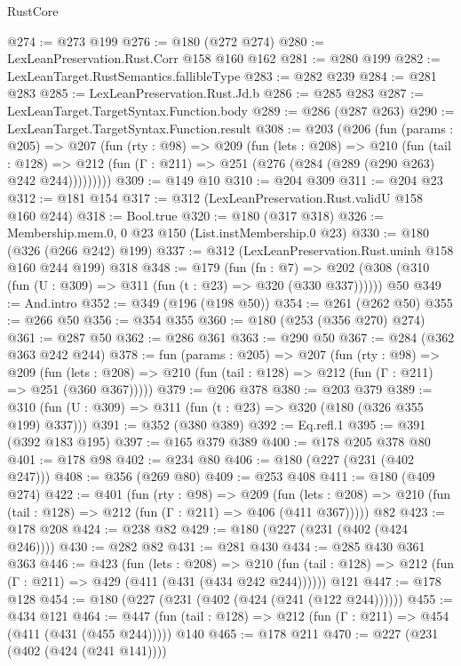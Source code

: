 \begin{lexlean}{RustCore}
\begin{coremodule}
@274 := @273 @199
@276 := @180 (@272 @274)
@280 := LexLeanPreservation.Rust.Corr @158 @160 @162
@281 := @280 @199
@282 := LexLeanTarget.RustSemantics.fallibleType
@283 := @282 @239
@284 := @281 @283
@285 := LexLeanPreservation.Rust.Jd.b
@286 := @285 @283
@287 := LexLeanTarget.TargetSyntax.Function.body
@289 := @286 (@287 @263)
@290 := LexLeanTarget.TargetSyntax.Function.result
@308 := @203
    (@206
      (fun (params : @205) =>
      @207
        (fun (rty : @98) =>
        @209
          (fun (lets : @208) =>
          @210
            (fun (tail : @128) =>
            @212 (fun (Γ : @211) => @251 (@276 (@284 (@289 (@290 @263) @242 @244)))))))))
@309 := @149 @10
@310 := @204 @309
@311 := @204 @23
@312 := @181 @154
@317 := @312 (LexLeanPreservation.Rust.validU @158 @160 @244)
@318 := Bool.true
@320 := @180 (@317 @318)
@326 := Membership.mem.{0, 0} @23 @150 (List.instMembership.{0} @23)
@330 := @180 (@326 (@266 @242) @199)
@337 := @312 (LexLeanPreservation.Rust.uninh @158 @160 @244 @199) @318
@348 := @179
    (fun (fn : @7) =>
    @202 (@308 (@310 (fun (U : @309) => @311 (fun (t : @23) => @320 (@330 @337))))))
    @50
@349 := And.intro
@352 := @349 (@196 (@198 @50))
@354 := @261 (@262 @50)
@355 := @266 @50
@356 := @354 @355
@360 := @180 (@253 (@356 @270) @274)
@361 := @287 @50
@362 := @286 @361
@363 := @290 @50
@367 := @284 (@362 @363 @242 @244)
@378 := fun (params : @205) =>
  @207
    (fun (rty : @98) =>
    @209
      (fun (lets : @208) => @210 (fun (tail : @128) => @212 (fun (Γ : @211) => @251 (@360 @367)))))
@379 := @206 @378
@380 := @203 @379
@389 := @310 (fun (U : @309) => @311 (fun (t : @23) => @320 (@180 (@326 @355 @199) @337)))
@391 := @352 (@380 @389)
@392 := Eq.refl.{1}
@395 := @391 (@392 @183 @195)
@397 := @165 @379 @389
@400 := @178 @205 @378 @80
@401 := @178 @98
@402 := @234 @80
@406 := @180 (@227 (@231 (@402 @247)))
@408 := @356 (@269 @80)
@409 := @253 @408
@411 := @180 (@409 @274)
@422 := @401
    (fun (rty : @98) =>
    @209
      (fun (lets : @208) => @210 (fun (tail : @128) => @212 (fun (Γ : @211) => @406 (@411 @367)))))
    @82
@423 := @178 @208
@424 := @238 @82
@429 := @180 (@227 (@231 (@402 (@424 @246))))
@430 := @282 @82
@431 := @281 @430
@434 := @285 @430 @361 @363
@446 := @423
    (fun (lets : @208) =>
    @210 (fun (tail : @128) => @212 (fun (Γ : @211) => @429 (@411 (@431 (@434 @242 @244))))))
    @121
@447 := @178 @128
@454 := @180 (@227 (@231 (@402 (@424 (@241 (@122 @244))))))
@455 := @434 @121
@464 := @447 (fun (tail : @128) => @212 (fun (Γ : @211) => @454 (@411 (@431 (@455 @244))))) @140
@465 := @178 @211
@470 := @227 (@231 (@402 (@424 (@241 @141))))

\end{coremodule}
\end{lexlean}

